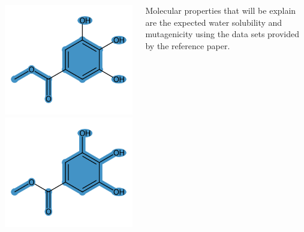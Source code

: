 \documentclass[14pt, a2paper, portrait]{tikzposter}
\begin{document}
\begin{columns}
{		\begin{tikzfigure}
			\includegraphics[scale=0.7]{../data/images/example_functional_groups.png}
			\includegraphics[scale=0.7]{../data/images/example_brics.png}
		\end{tikzfigure}

        Molecular properties that will be explain are the expected water solubility 
        and mutagenicity using the data sets provided by the reference paper\cite{wu2023chemistry}.
	}

    
	 {
		\vspace{-0.5cm}
		
	}

\end{columns}
\end{document}
